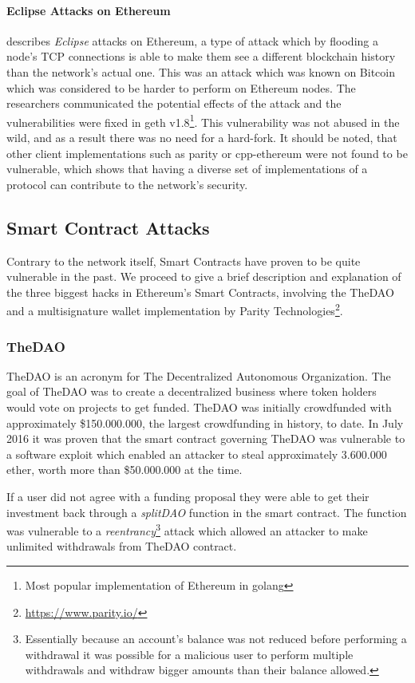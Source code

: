 \paragraph{Eclipse Attacks on Ethereum}
\cite{cryptoeprint:2018:236} describes \textit{Eclipse} attacks on Ethereum, a type of attack which by flooding a node's TCP connections is able to make them see a different blockchain history than the network's actual one. This was an attack which was known on Bitcoin which was considered to be harder to perform on Ethereum nodes. The researchers communicated the potential effects of the attack and the vulnerabilities were fixed in geth v1.8\footnote{Most popular implementation of Ethereum in golang}. This vulnerability was not abused in the wild, and as a result there was no need for a hard-fork. It should be noted, that other client implementations such as parity or cpp-ethereum were not found to be vulnerable, which shows that having a diverse set of implementations of a protocol can contribute to the network's security.

\subsection{Smart Contract Attacks}
Contrary to the network itself, Smart Contracts have proven to be quite vulnerable in the past. We proceed to give a brief description and explanation of the three biggest hacks in Ethereum's Smart Contracts, involving the TheDAO and a multisignature wallet implementation by Parity Technologies\footnote{\url{https://www.parity.io/}}.

\subsubsection{TheDAO}
TheDAO is an acronym for The Decentralized Autonomous Organization. The goal of TheDAO was to create a decentralized business where token holders would vote on projects to get funded. TheDAO was initially crowdfunded with approximately \$150.000.000, the largest crowdfunding in history, to date. In July 2016 it was proven that the smart contract governing TheDAO was vulnerable to a software exploit which enabled an attacker to steal approximately 3.600.000 ether, worth more than \$50.000.000 at the time.

If a user did not agree with a funding proposal they were able to get their investment back through a \textit{splitDAO} function in the smart contract. The function was vulnerable to a \textit{reentrancy}\footnote{Essentially because an account's balance was not reduced before performing a withdrawal it was possible for a malicious user to perform multiple withdrawals and withdraw bigger amounts than their balance allowed.} attack which allowed an attacker to make unlimited withdrawals from TheDAO contract\cite{bloombergdao,hackingdistibuteddao}.

